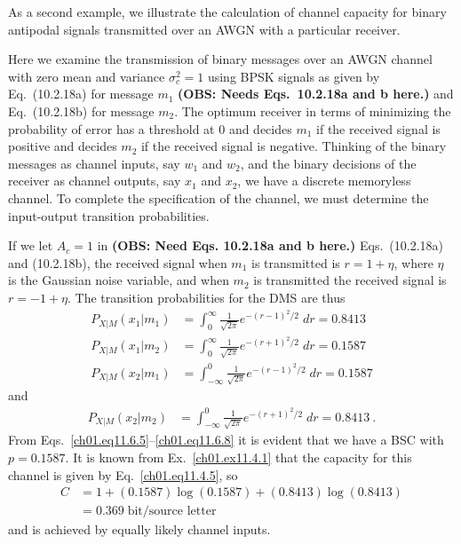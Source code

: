 As a second example, we illustrate the calculation of channel
capacity for binary antipodal signals transmitted  over
an AWGN with a particular receiver.

\begin{example}
\label{ch01.ex11.6.2}
Here we examine the transmission of binary messages over an AWGN
channel with zero mean and variance $\sigma_c^2 = 1$ using BPSK
signals as given by Eq.~(10.2.18a) for message $m_1$
\textbf{(OBS: Needs Eqs.~10.2.18a and b here.) }
and Eq.~(10.2.18b) for message $m_2$.
The optimum receiver in terms of minimizing the probability of
error has a threshold at $0$ and decides $m_1$ if the received signal
is positive and decides $m_2$ if the received signal is negative.
Thinking of the binary messages as channel inputs, say
$w_1$ and $w_2$, and the binary decisions of the receiver as
channel outputs, say $x_1$ and $x_2$, we have a discrete memoryless
channel.
To complete the specification of the channel, we must determine
the input-output transition probabilities.

If we let $A_c = 1$ in
\textbf{(OBS: Need Eqs. 10.2.18a and b here.) }
Eqs.~(10.2.18a) and (10.2.18b),
the received signal when $m_1$ is transmitted is $r=1+\eta$,
where $\eta$ is the Gaussian noise variable, and when
$m_2$ is transmitted the received  signal is $r = -1 + \eta$.
The transition probabilities for the DMS are thus
\begin{align}
        P_{X|M} \left( x_1 | m_1 \right)
         & =
          \int_0^{\infty} \frac{1}{ \sqrt{2 \pi} }
            e^{- (r-1)^2/2 }  \; dr = 0.8413
\label{ch01.eq11.6.5}                                   \\
        P_{X|M} \left( x_1 | m_2 \right)
         & =
          \int_0^{\infty} \frac{1}{ \sqrt{2 \pi} }
            e^{- (r+1)^2/2 }  \; dr = 0.1587
\label{ch01.eq11.6.6}                                   \\
        P_{X|M} \left( x_2 | m_1 \right)
         & =
          \int_{- \infty}^0 \frac{1}{ \sqrt{2 \pi} }
            e^{- (r-1)^2/2 }  \; dr = 0.1587
\label{ch01.eq11.6.7}
\end{align}
and
\begin{align}
        P_{X|M} \left( x_2 | m_2 \right)
         & =
          \int_{- \infty}^0 \frac{1}{ \sqrt{2 \pi} }
            e^{- (r+1)^2/2 }  \; dr = 0.8413~.
\label{ch01.eq11.6.8}
\end{align}
From Eqs.~\eqref{ch01.eq11.6.5}--\eqref{ch01.eq11.6.8}
it is evident that we have a BSC with $p=0.1587$.
It is known from Ex.~\ref{ch01.ex11.4.1} that the capacity
for this channel is given by Eq.~\eqref{ch01.eq11.4.5}, so
\begin{align}
        C & = 1+(0.1587) \log (0.1587) + (0.8413) \log (0.8413)
                        \nonumber \\
          & = 0.369 \; \text{bit/source letter}
\label{ch01.eq11.6.9}
\end{align}
and is achieved by equally likely channel inputs.
\end{example}

